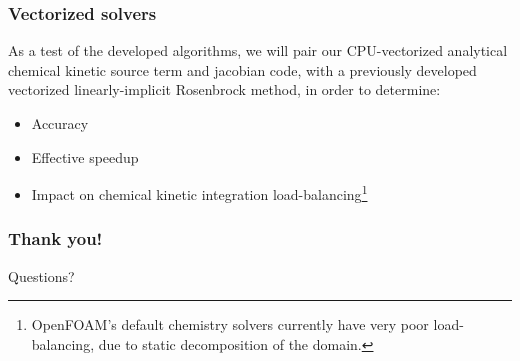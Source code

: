 \documentclass{beamer}
\begin{document}
\begin{frame}
 \frametitle{Vectorized solvers}
 As a test of the developed algorithms, we will pair our CPU-vectorized analytical chemical kinetic source term and jacobian code, with a previously developed vectorized linearly-implicit Rosenbrock method, in order to determine:
 \begin{itemize}
  \item Accuracy
  \item Effective speedup
  \item Impact on chemical kinetic integration load-balancing\footnote{OpenFOAM's default chemistry solvers currently have very poor load-balancing, due to static decomposition of the domain.}
 \end{itemize}
\end{frame}

\begin{frame}
 \frametitle{Thank you!}
 \large Questions?
\end{frame}
\end{document}
